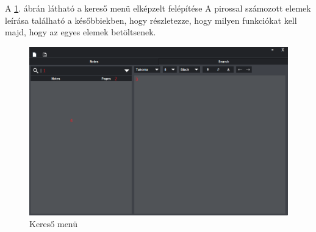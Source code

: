 
A \ref{fig:menu_search}. ábrán látható a kereső menü elképzelt felépítése A pirossal számozott elemek leírása található a későbbiekben, hogy részletezze, hogy milyen funkciókat kell majd, hogy az egyes elemek betöltsenek.

\begin{figure}[h]
	\centering
	\includegraphics[scale=0.5]{images/menu_3.png}
	\caption{Kereső menü}
	\label{fig:menu_search}
\end{figure}

